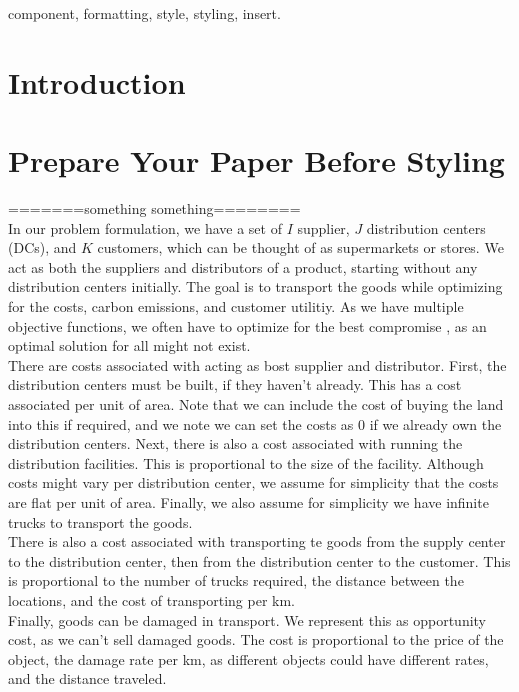 \documentclass[conference]{IEEEtran}
\begin{document}
\begin{IEEEkeywords}
component, formatting, style, styling, insert.
\end{IEEEkeywords}

\section{Introduction}

\section{Prepare Your Paper Before Styling}
=======something something========\\
In our problem formulation, we have a set of $I$ supplier, $J$ distribution centers (DCs), and $K$ customers, which can be thought of as supermarkets or stores.
We act as both the suppliers and distributors of a product, starting without any distribution centers initially. The goal is to transport the goods while optimizing for the costs, carbon emissions, and customer utilitiy. As we have multiple objective functions, we often have to optimize for the best compromise  \cite{benayounLinearProgrammingMultiple1971}, as an optimal solution for all might not exist. \\
There are costs associated with acting as bost supplier and distributor. First, the distribution 
centers must be built, if they haven't already. This has a cost associated per unit of area. Note that we can include the cost of buying the land into this if required, and we note we can set the costs as 0 if we already own the distribution centers.
Next, there is also a cost associated with running the distribution facilities. This is proportional to the size of the facility. Although costs might vary per distribution center, we assume for simplicity that the costs are flat per unit of area. Finally, we also assume for simplicity we have infinite trucks to transport the goods. \\
There is also a cost associated with transporting te goods from the supply center to the distribution center, then from the distribution center to the customer. This is proportional to the number of trucks required, the distance between the locations, and the cost of transporting per km.\\
Finally, goods can be damaged in transport. We represent this as opportunity cost, as we can't sell damaged goods. The cost is proportional to the price of the object, the damage rate per km, as different objects could have different rates, and the distance traveled.\\
\end{document}

